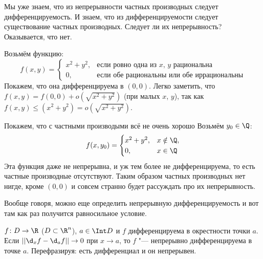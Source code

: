 \begin{exmp}
	Мы уже знаем, что из непрерывности частных производных следует дифференцируемость.
	И знаем, что из дифференцируемости следует существование частных производных.
	Следует ли их непрерывность?
	Оказывается, что нет.

	Возьмём функцию:
	\[
	f(x, y) =
		\begin{cases}
			x^2 + y^2, & \text{если ровно одна из $x$, $y$ рациональна} \\
			0, & \text{если обе рациональны или обе иррациональны}
		\end{cases}
	\]
	Покажем, что она дифференцируема в $(0, 0)$.
	Легко заметить, что $f(x, y) = f(0, 0) + o(\sqrt{x^2+y^2})$ (при малых $x$, $y$),
	так как $f(x, y) \le (x^2 + y^2) = o(\sqrt{x^2+y^2})$.

	Покажем, что с частными производыми всё не очень хорошо
	Возьмём $y_0 \in \Q$:
	\[
		f(x, y_0) =
			\begin{cases}
				x^2 + y^2, & x \notin \Q, \\
				0, & x \in \Q
			\end{cases}
	\]
	Эта функция даже не непрерывна, и уж тем более не дифференцируема, то есть частные производные отсутствуют.
	Таким образом частных производных нет нигде, кроме $(0, 0)$ и совсем странно будет рассуждать про их непрерывность.
\end{exmp}
\begin{Rem}
	Вообще говоря, можно еще определить непрерывную дифференцируемость и вот там как раз получится равносильное условие.
\end{Rem}

\begin{Def}
	$f\colon D \to \R$ ($D \subset \R^n$), $a \in \Int D$ и $f$ дифференцируема в окрестности точки $a$.
	Если $||\d_x f - \d_a f|| \to 0$ при $x \to a$, то $f$ "--- непрерывно дифференцируема в точке $a$.
	Перефразируя: есть дифференциал и он непрерывен.
\end{Def}

